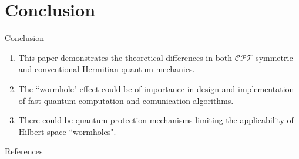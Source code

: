 \documentclass[10pt]{beamer}
\begin{document}
\section{Conclusion}
\begin{frame}{Conclusion}
\begin{enumerate}
    \item This paper demonstrates the theoretical differences in both $\mathcal{CPT}$-symmetric and conventional Hermitian quantum mechanics.\\
    \item The ``wormhole" effect could be of importance in design and implementation of fast quantum computation and comunication algorithms.\\
    \item There could be quantum protection mechanisms limiting the applicability of Hilbert-space ``wormholes".
\end{enumerate}
\end{frame}

\begin{frame}{References} 
    \nocite{*}
    
    
\end{frame}




\end{document}
